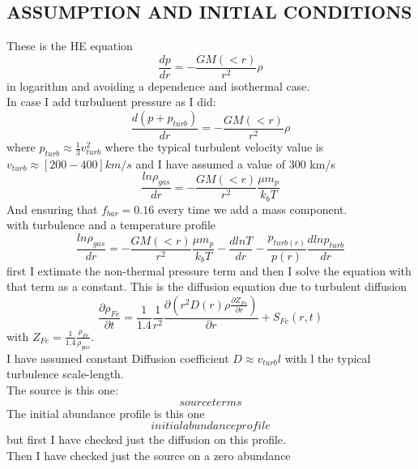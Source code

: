 \documentclass{article}
\numberwithin{equation}{subsection}
\begin{document}
\subsection{ASSUMPTION AND INITIAL CONDITIONS}
These is the HE equation 
\begin{equation}
    \frac{dp}{dr}=-\frac{GM(<r)}{r^2}\rho
\end{equation}
in logarithm and avoiding a dependence and isothermal case.\\
In case I add turbuluent pressure as I did:
\begin{equation}
    \frac{d(p+p_{turb})}{dr}=-\frac{GM(<r)}{r^2}\rho
\end{equation}
where $p_{turb}\approx \frac{1}{3}v_{turb}^2$ where the typical
turbulent velocity value is $v_{turb}\approx[200-400]km/s$ and
I have assumed a value of 300 km/s
\begin{equation}
    \frac{ln\rho _{gas}}{dr}=-\frac{G M(<r)}{r^2} \frac{\mu m_p}{k_b T}
\end{equation}
And ensuring that $f_{bar}=0.16$ every time we add a mass component.\\
with turbulence and a temperature profile
\begin{equation}
    \frac{ln\rho _{gas}}{dr}=-\frac{G M(<r)}{r^2} \frac{\mu m_p}{k_b T} - \frac{dlnT}{dr} - \frac{p_{turb(r)}}{p(r)}\frac{dlnp_{turb}}{dr}
\end{equation}
first I extimate the non-thermal pressure term and then I solve the equation with that term as a constant.
This is the diffusion equation due to turbulent diffusion
\begin{equation}
    \frac{\partial \rho_{Fe}}{\partial t}=\frac{1}{1.4}\frac{1}{r^2}\frac{\partial(r^2 D(r) \rho \frac{\partial Z_{Fe}}{\partial r})}{\partial r} + S_{Fe}(r,t)
\end{equation}
with $Z_{Fe}=\frac{1}{1.4}\frac{\rho _{Fe}}{\rho _{gas}}$.\\
I have assumed constant Diffusion coefficient $D\approx v_{turb} l $ with l the
typical turbulence scale-length.\\
The source is this one:
\begin{equation}
    source terms
\end{equation}
The initial abundance profile is this one
\begin{equation}
    initial abundance profile
\end{equation}
but first I have checked just the diffusion on 
this profile.\\
Then I have checked just the source on a zero abundance
\end{document}
